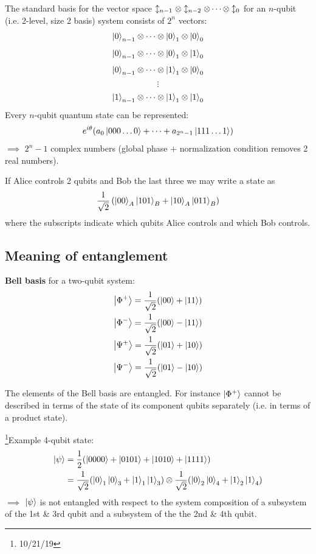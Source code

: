 \documentclass[12pt]{article}
\begin{document}
The standard basis for the vector space $\updownarrow_{n-1} \otimes \updownarrow_{n-2} \otimes
\cdots \otimes \updownarrow_0$ for an $n$-qubit (i.e. 2-level, size 2 basis) system
consists of $2^n$ vectors:
\[\ket{0}_{n-1} \otimes \cdots \otimes \ket{0}_1 \otimes \ket{0}_0\]
\[\ket{0}_{n-1} \otimes \cdots \otimes \ket{0}_1 \otimes \ket{1}_0\]
\[\ket{0}_{n-1} \otimes \cdots \otimes \ket{1}_1 \otimes \ket{0}_0\]
\[\vdots\]
\[\ket{1}_{n-1} \otimes \cdots \otimes \ket{1}_1 \otimes \ket{1}_0\]
Every $n$-qubit quantum state can be represented:
\[e^{i\theta}(a_0\ket{000\ldots0} + \cdots + a_{2^n-1} \ket{111\ldots1})\]
$\implies$ $2^n - 1$ complex numbers (global phase + normalization condition
removes 2 real numbers).

If Alice controls 2 qubits and Bob the last three we may write a state as
\[ \frac{1}{\sqrt{2}} \left( \ket{00}_A\ket{101}_B +
\ket{10}_A\ket{011}_B\right)\]
where the subscripts indicate which qubits Alice controls and which Bob
controls.

\subsection{Meaning of entanglement}
\textbf{Bell basis} for a two-qubit system:
\begin{equation}\begin{gathered}
\ket{\Phi^+} = \frac{1}{\sqrt{2}} (\ket{00} + \ket{11}) \\
\ket{\Phi^-} = \frac{1}{\sqrt{2}} (\ket{00} - \ket{11}) \\
\ket{\Psi^+} = \frac{1}{\sqrt{2}} (\ket{01} + \ket{10}) \\
\ket{\Psi^-} = \frac{1}{\sqrt{2}} (\ket{01} - \ket{10})
\label{eq:bell-basis}
\end{gathered}\end{equation}

The elements of the Bell basis are entangled. For instance $\ket{\Phi^+}$
cannot be described in terms of the state of its component qubits separately
(i.e. in terms of a product state).

\footnote{10/21/19}Example 4-qubit state:
\begin{alignat}{1}
    \ket{\psi} &= \frac{1}{2}
        (\ket{0000} + \ket{0101} + \ket{1010} + \ket{1111}) \\
    &= \frac{1}{\sqrt{2}} (\ket{0}_1\ket{0}_3 + \ket{1}_1\ket{1}_3) \otimes
        \frac{1}{\sqrt{2}} (\ket{0}_2\ket{0}_4 + \ket{1}_2\ket{1}_4)
\end{alignat}
$\implies$ $\ket{\psi}$ is not entangled with respect to the system composition
of a subsystem of the 1st \& 3rd qubit and a subsystem of the the 2nd \& 4th
qubit.
\end{document}
